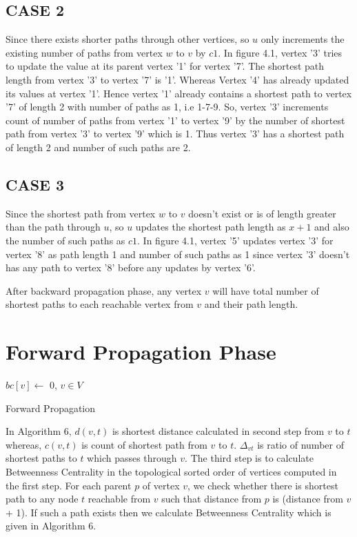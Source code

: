 \subsection{CASE 2}
Since there exists shorter paths through other vertices, so $u$ only increments the existing number of paths from vertex $w$ to $v$ by $c1$.
In figure 4.1, vertex '3' tries to update the value at its parent vertex '1' for vertex '7'. The shortest path length from vertex '3' to vertex '7' is  '1'. Whereas Vertex '4' has already updated its values at vertex '1'. Hence vertex '1' already contains a shortest path to vertex '7' of length 2 with number of paths as 1, i.e 1-7-9.
So, vertex '3' increments count of number of paths from vertex '1' to vertex '9' by the number of shortest path from vertex '3' to vertex '9' which is 1. Thus vertex '3' has a shortest path of length 2 and number of such paths are 2.

\subsection{CASE 3}
Since the shortest path from vertex $w$ to $v$ doesn't exist or is of length greater than the path through $u$, so $u$ updates the shortest path length as $x + 1$ and also the number of such paths as $c1$.
In figure 4.1, vertex '5' updates vertex '3' for vertex '8' as path length 1 and number of such paths as 1 since vertex '3' doesn't has any path to vertex '8' before any updates by vertex '6'. 

After backward propagation phase, any vertex $v$ will have total number of shortest paths to each reachable vertex from $v$ and their path length.
\section{Forward Propagation Phase}

\begin{algorithm}
$bc[v] \leftarrow$ 0, $v \in V$\;
\caption{Forward Propagation}
\end{algorithm}

In Algorithm 6, $d(v,t)$ is shortest distance calculated in second step from $v$ to $t$ whereas, $c(v,t)$ is count of shortest path from $v$ to $t$. $\Delta_{vt}$ is ratio of number of shortest paths to $t$ which passes through $v$. 
The third step is to calculate Betweenness Centrality in the topological sorted order of vertices computed in the first step. For each parent $p$ of vertex $v$, we check whether there is shortest path to any node $t$ reachable from $v$ such that distance from $p$ is (distance from $v$ + 1). If such a path exists then we calculate Betweenness Centrality which is given in Algorithm 6. 



